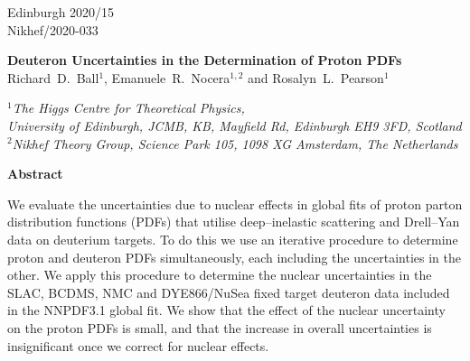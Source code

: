 \documentclass[11pt,a4paper]{article}
\begin{document}
\begin{flushright}
Edinburgh 2020/15\\
Nikhef/2020-033\\
\end{flushright}
\vspace{0.3cm}

\begin{center}
  {\Large \bf Deuteron Uncertainties in the Determination of Proton PDFs\\}
  \vspace{1.5cm}
  {\small
  Richard~D.~Ball$^1$, 
  Emanuele~R.~Nocera$^{1,2}$
  and Rosalyn~L.~Pearson$^1$}

\vspace{0.5cm}
{$^1${\it\small The Higgs Centre for Theoretical Physics,\\ 
 University of Edinburgh, JCMB, KB, Mayfield Rd, Edinburgh EH9 3FD, Scotland}\\
 $^2${\it\small Nikhef Theory Group, 
 Science Park 105, 1098 XG Amsterdam, The Netherlands}\\
}

\vspace{1cm}

{\bf \large Abstract}

\end{center}

We evaluate the uncertainties due to nuclear effects in global
fits of proton parton distribution functions (PDFs) that utilise
deep--inelastic scattering and Drell--Yan data on deuterium targets. To do 
this we use an iterative procedure to determine proton and deuteron 
PDFs simultaneously, each including the uncertainties in the other.
We apply this procedure to determine the nuclear uncertainties in the
SLAC, BCDMS, NMC and DYE866/NuSea fixed target deuteron data included
in the NNPDF3.1 global fit. We show that the effect of the nuclear uncertainty
on the proton PDFs is small, and that the increase in overall uncertainties is
insignificant once we correct for nuclear effects.
\newline
\end{document}
